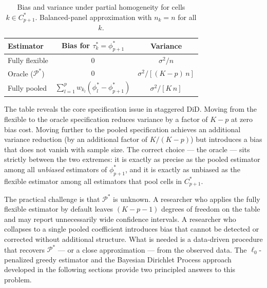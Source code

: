\documentclass[margin=3in, 12pt]{article}
\newcommand{\1}{\mathbbm{1}}
\begin{document}
\begin{table}[ht]
  \centering
  \caption{Bias and variance under partial homogeneity for cells $k \in C_{p+1}^*$.
    Balanced-panel approximation with $n_k = n$ for all $k$.}
  \label{tab:spec_tradeoff}
  \begin{tabular}{lcc}
    \toprule
    Estimator & Bias for $\tau_k^* = \phi_{p+1}^*$ & Variance \\
    \midrule
    Fully flexible  & $0$                              & $\sigma^2 / n$ \\[4pt]
    Oracle ($\mathcal{P}^*$) & $0$               & $\sigma^2 / [(K-p)\,n]$ \\[4pt]
    Fully pooled    & $\displaystyle\sum_{l=1}^p w_{k_l}(\phi_l^* - \phi_{p+1}^*)$ & $\sigma^2 / [K\,n]$ \\
    \bottomrule
  \end{tabular}
\end{table}

\noindent The table reveals the core specification issue in staggered DiD.
Moving from the flexible to the oracle specification reduces variance by a
factor of $K-p$ at zero bias cost.
Moving further to the pooled specification achieves an additional variance
reduction (by an additional factor of $K/(K-p)$) but introduces a bias that
does not vanish with sample size.
The correct choice --- the oracle --- sits strictly between the two
extremes: it is exactly as precise as the pooled estimator among all
\emph{unbiased} estimators of $\phi_{p+1}^*$, and it is exactly as unbiased
as the flexible estimator among all estimators that pool cells in $C_{p+1}^*$.

The practical challenge is that $\mathcal{P}^*$ is unknown.
A researcher who applies the fully flexible estimator by default leaves
$(K-p-1)$ degrees of freedom on the table and may report unnecessarily
wide confidence intervals.
A researcher who collapses to a single pooled coefficient introduces
bias that cannot be detected or corrected without additional structure.
What is needed is a data-driven procedure that recovers $\mathcal{P}^*$
--- or a close approximation --- from the observed data.
The $\ell_0$-penalized greedy estimator and the Bayesian Dirichlet Process
approach developed in the following sections provide two principled answers
to this problem.

\end{document}
